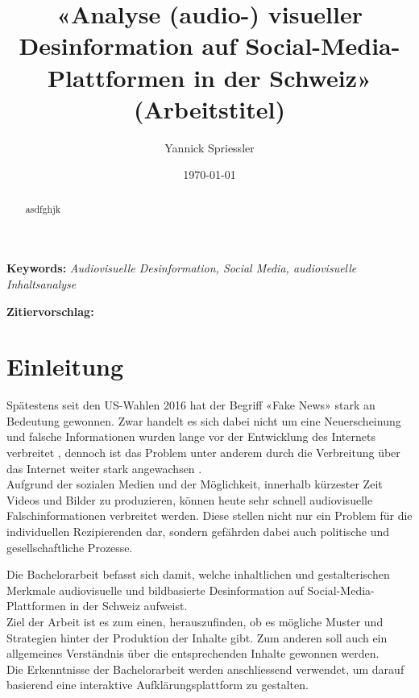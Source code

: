 \documentclass[12pt,a4paper]{article}        %
\title{«Analyse (audio-) visueller Desinformation auf Social-Media-Plattformen in der Schweiz» (Arbeitstitel)}        %
\author{Yannick Spriessler}     %
\date{\today}     %
\begin{document}
\begin{titlingpage} %
  
  \nocite{howard_trees_2017}  %
\end{titlingpage}
\pagebreak      %
\renewcommand{\abstractname}{Abstract}
\begin{abstract}
  \setlength{\parindent}{0pt}  
    asdfghjk 
\end{abstract}

\textbf{Keywords:} \textit{Audiovisuelle Desinformation, Social Media, audiovisuelle Inhaltsanalyse}


\textbf{Zitiervorschlag:}
\linebreak
\pagebreak
\thispagestyle{empty}
\setcounter{page}{0}    %
\tableofcontents        %
\pagebreak

\section{Einleitung}
Spätestens seit den US-Wahlen 2016 hat der Begriff «Fake News» stark an Bedeutung gewonnen. Zwar handelt es sich dabei nicht um eine Neuerscheinung und falsche Informationen wurden lange vor der Entwicklung des Internets verbreitet \parencites[214]{allcott_social_2017}[247]{hohlfeld_schlechte_2020}[1]{khan_fake_2021}, dennoch ist das Problem unter anderem durch die Verbreitung über das Internet weiter stark angewachsen \parencites[214–215]{allcott_social_2017}[1]{khan_fake_2021}[1]{lazer_science_2018}[4]{ceron_fake_2021}. \\
Aufgrund der sozialen Medien und der Möglichkeit, innerhalb kürzester Zeit Videos und Bilder zu produzieren, können heute sehr schnell audiovisuelle Falschinformationen verbreitet werden. Diese stellen nicht nur ein Problem für die individuellen Rezipierenden dar, sondern gefährden dabei auch politische und gesellschaftliche Prozesse.

Die Bachelorarbeit befasst sich damit, welche inhaltlichen und gestalterischen Merkmale audiovisuelle und bildbasierte Desinformation auf Social-Media-Plattformen in der Schweiz aufweist. \\
Ziel der Arbeit ist es zum einen, herauszufinden, ob es mögliche Muster und
Strategien hinter der Produktion der Inhalte gibt. Zum anderen soll auch ein
allgemeines Verständnis über die entsprechenden Inhalte gewonnen werden. \\
Die Erkenntnisse der Bachelorarbeit werden anschliessend verwendet, um darauf basierend eine interaktive Aufklärungsplattform zu gestalten.
\end{document}

